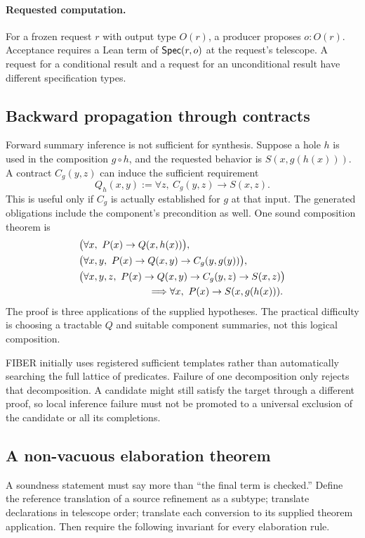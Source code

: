\documentclass[11pt,letterpaper]{article}
\theoremstyle{definition}\newtheorem{definition}[theorem]{Definition}
\begin{document}
\paragraph{Requested computation.}
For a frozen request $r$ with output type $O(r)$, a producer proposes $o:O(r)$. Acceptance requires a Lean term of $\mathsf{Spec}(r,o)$ at the request's telescope. A request for a conditional result and a request for an unconditional result have different specification types.

\subsection{Backward propagation through contracts}
Forward summary inference is not sufficient for synthesis. Suppose a hole $h$ is used in the composition $g\circ h$, and the requested behavior is $S(x,g(h(x)))$. A contract $C_g(y,z)$ can induce the sufficient requirement
\[
 Q_h(x,y):=\forall z,\ C_g(y,z)\to S(x,z).
\]
This is useful only if $C_g$ is actually established for $g$ at that input. The generated obligations include the component's precondition as well. One sound composition theorem is
\begin{align*}
 &\bigl(\forall x,\ P(x)\to Q(x,h(x))\bigr),\\
 &\bigl(\forall x,y,\ P(x)\to Q(x,y)\to C_g(y,g(y))\bigr),\\
 &\bigl(\forall x,y,z,\ P(x)\to Q(x,y)\to C_g(y,z)\to S(x,z)\bigr)\\
 &\hspace{25mm}\Longrightarrow
   \forall x,\ P(x)\to S(x,g(h(x))).
\end{align*}
The proof is three applications of the supplied hypotheses. The practical difficulty is choosing a tractable $Q$ and suitable component summaries, not this logical composition.

FIBER initially uses registered sufficient templates rather than automatically searching the full lattice of predicates. Failure of one decomposition only rejects that decomposition. A candidate might still satisfy the target through a different proof, so local inference failure must not be promoted to a universal exclusion of the candidate or all its completions.

\subsection{A non-vacuous elaboration theorem}
A soundness statement must say more than ``the final term is checked.'' Define the reference translation of a source refinement as a subtype; translate declarations in telescope order; translate each conversion to its supplied theorem application. Then require the following invariant for every elaboration rule.
\end{document}

